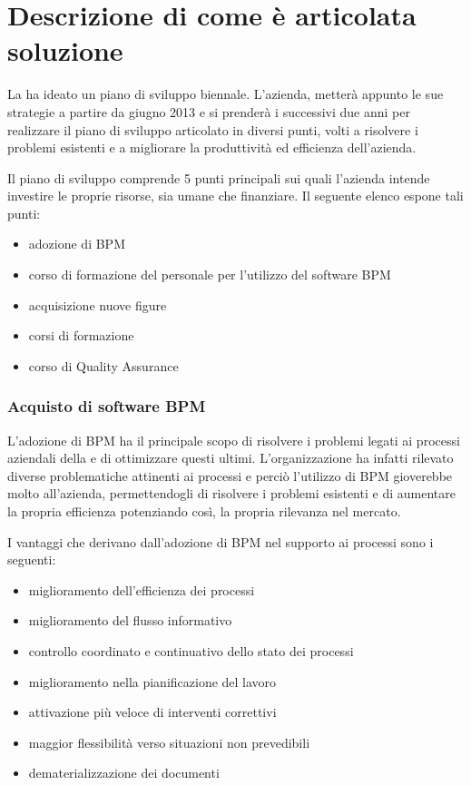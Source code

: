 \section{Descrizione di come è articolata soluzione}
La \customer ha ideato un piano di sviluppo biennale. L'azienda, metterà appunto le sue strategie a partire da giugno 2013 e si prenderà i successivi due anni per realizzare il piano di sviluppo articolato in diversi punti, volti a risolvere i problemi esistenti e a migliorare la produttività ed efficienza dell'azienda.
		
Il piano di sviluppo comprende 5 punti principali sui quali l'azienda intende investire le proprie risorse, sia umane che finanziare. Il seguente elenco espone tali punti:
	\begin{itemize}
  		\item adozione di  BPM
       \item corso di formazione del personale per l'utilizzo del software BPM
       \item acquisizione nuove figure
       \item corsi di formazione 
        \item corso di Quality Assurance  
     \end{itemize}
	
	
    \subsubsection{Acquisto di software BPM}
    
    L'adozione di  BPM ha il principale scopo di risolvere i problemi legati ai processi aziendali della \customer e di ottimizzare questi ultimi. L'organizzazione ha infatti rilevato diverse problematiche attinenti ai processi e perciò l'utilizzo di \sw BPM gioverebbe molto all'azienda, permettendogli di risolvere i problemi esistenti e di aumentare la propria efficienza potenziando così, la propria rilevanza nel mercato.



I vantaggi che derivano dall'adozione di \sw BPM nel supporto ai processi sono i seguenti:

\begin{itemize}
	\item miglioramento dell'efficienza dei processi
	\item miglioramento del flusso informativo
	\item controllo coordinato e continuativo dello stato dei processi
	\item miglioramento nella pianificazione del lavoro
	\item attivazione più veloce di interventi correttivi
	\item maggior flessibilità verso situazioni non prevedibili
	\item dematerializzazione dei documenti 	
\end{itemize}


